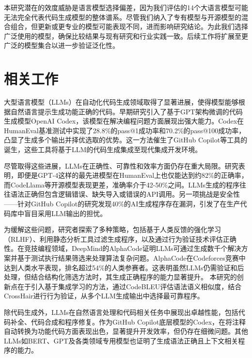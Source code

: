\documentclass{article}
\begin{document}
本研究潜在的效度威胁是语言模型选择偏差，因为我们评估的14个大语言模型可能无法完全代表代码生成模型的整体谱系。尽管我们纳入了专有模型与开源模型的混合组合，但更新或更专业的模型可能表现不同，进而影响研究结论。为此我们选择广泛使用的模型，确保比较结果与现有研究和行业实践一致。后续工作将扩展至更广泛的模型集合以进一步验证泛化性。
\section{相关工作}
大型语言模型（LLMs）在自动化代码生成领域取得了显著进展，使得模型能够根据自然语言提示生成功能正确的代码。早期研究引入了基于GPT架构微调的代码生成模型OpenAI Codex，该模型在解决编程问题方面展现出强大能力\cite{chen2021evaluating}。Codex在HumanEval基准测试中实现了28.8\%的pass@1成功率和70.2\%的pass@100成功率，凸显了生成多个输出并择优选取的优势。这一方法催生了GitHub Copilot等工具的诞生，这些工具将基于LLM的代码生成集成至现代集成开发环境\cite{pearce2022asleep}。

尽管取得这些进展，LLMs在正确性、可靠性和效率方面仍存在重大局限。研究表明，即便是GPT-4这样的最先进模型在HumanEval上也仅能达到约82\%的正确率，而CodeLlama等开源模型表现更差，准确率介于42-50\%之间\cite{bubeck2023sparks, ziemniak2023codellama}。LLMs生成的程序往往语法正确但包含逻辑错误、缺失导入或错误的API调用。另一项挑战是安全性——针对GitHub Copilot的研究发现40\%的AI生成程序存在漏洞，引发了在生产代码库中盲目采用LLM输出的担忧\cite{pearce2022asleep}。

为缓解这些问题，研究者探索了多种策略，包括基于人类反馈的强化学习（RLHF）、利用静态分析工具过滤生成程序，以及通过行为验证技术评估正确性\cite{zhao2022large}。在竞技编程领域，DeepMind的AlphaCode证明LLMs可通过生成数千个解决方案并基于测试执行结果筛选来处理算法复杂问题。AlphaCode在Codeforces竞赛中达到人类水平表现，排名超过54\%的人类参赛者\cite{li2022competition}。这表明虽然LLMs仍需验证和后处理，但结合结构化筛选方法时，其生成正确程序的能力显著提升。
本研究的创新点在于引入基于集成学习的方法，通过CodeBLEU评估语法语义相似度，结合CrossHair进行行为验证，从多个LLM生成输出中选择最可靠程序。

除代码生成外，LLMs在自然语言处理和代码相关任务中展现出卓越性能，包括代码补全\cite{deng2022fuzzing, huang2022prompt, jain2022jigsaw, li2022competition, xu2022systematic}、代码合成\cite{liu2023your}和程序修复\cite{xia2023automated}。作为GitHub Copilot底层模型的Codex\cite{codex}\cite{copilot}，在将注释自动转换为功能代码方面表现出色，显著提升开发效率，但仍存在细微问题。其他LLMs如BERT\cite{devlin2018bert, tian2023best}、GPT\cite{gpt4, chatGPT, xia2023keep}及各类领域专用模型\cite{le2023invalidator, paul2023automated}也证明了生成语法正确且上下文相关程序的能力。
\end{document}
